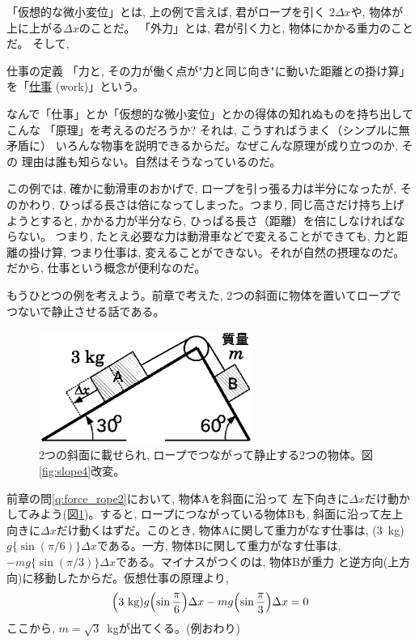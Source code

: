 「仮想的な微小変位」とは, 上の例で言えば, 君がロープを引く
$2\Delta x$や, 物体が上に上がる$\Delta x$のことだ。
「外力」とは, 君が引く力と, 物体にかかる重力のことだ。
そして, 
\begin{itembox}{仕事の定義}
「力と, その力が働く点が"力と同じ向き"に動いた距離との掛け算」を「\underline{仕事} (work)」という。
\end{itembox}

なんで「仕事」とか「仮想的な微小変位」とかの得体の知れぬものを持ち出してこんな
「原理」を考えるのだろうか? それは, こうすればうまく（シンプルに無矛盾に）
いろんな物事を説明できるからだ。なぜこんな原理が成り立つのか, その
理由は誰も知らない。自然はそうなっているのだ。

この例では, 確かに動滑車のおかげで, ロープを引っ張る力は半分になったが, 
そのかわり, ひっぱる長さは倍になってしまった。つまり, 同じ高さだけ持ち上げ
ようとすると, かかる力が半分なら, ひっぱる長さ（距離）を倍にしなければならない。
つまり, たとえ必要な力は動滑車などで変えることができても, 力と距離の掛け算, 
つまり仕事は, 変えることができない。それが自然の摂理なのだ。だから, 
仕事という概念が便利なのだ。

もうひとつの例を考えよう。前章で考えた, 2つの斜面に物体を置いてロープで
つないで静止させる話である。
\begin{figure}[h]
    \centering
    \includegraphics[width=7cm]{slope4b.eps}
    \caption{2つの斜面に載せられ, ロープでつながって静止する2つの物体。図\ref{fig:slope4}改変。}\label{fig:slope4b}
\end{figure}
\begin{exmpl}
前章の問\ref{q:force_rope2}において, 物体Aを斜面に沿って
左下向きに$\Delta x$だけ動かしてみよう(図\ref{fig:slope4b})。すると, ロープにつながっている物体Bも, 
斜面に沿って左上向きに$\Delta x$だけ動くはずだ。このとき, 
物体Aに関して重力がなす仕事は, (3~kg)$g\{\sin(\pi/6)\}\Delta x$である。一方, 
物体Bに関して重力がなす仕事は, $-mg\{\sin(\pi/3)\}\Delta x$である。マイナスがつくのは, 物体Bが重力
と逆方向(上方向)に移動したからだ。仮想仕事の原理より, 
\begin{eqnarray}
\Bigl(3\text{ kg})g\Bigl(\sin\frac{\pi}{6}\Bigr)\Delta x-mg\Bigl(\sin\frac{\pi}{3}\Bigr)\Delta x=0
\end{eqnarray}
ここから, $m=\sqrt{3}$~kgが出てくる。(例おわり)
\end{exmpl}

